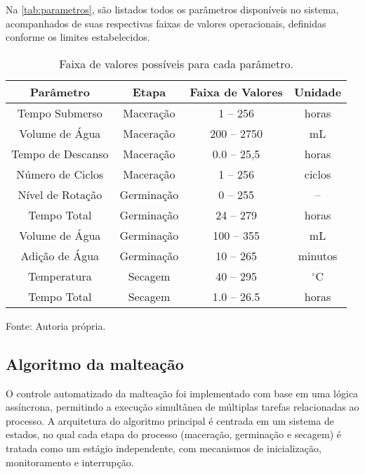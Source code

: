 Na \autoref{tab:parametros}, são listados todos os parâmetros disponíveis no sistema, acompanhados de suas respectivas faixas de valores operacionais, definidas conforme os limites estabelecidos.

\begin{table}[H]
    \caption{Faixa de valores possíveis para cada parâmetro.}
    \label{tab:parametros}
    \centering
    \begin{tabular}{cccc}
        \hline
        \bfseries Parâmetro & \bfseries Etapa & \bfseries Faixa de Valores & \bfseries Unidade \\
        \hline
        Tempo Submerso & Maceração & 1 -- 256  & horas \\
        Volume de Água & Maceração & 200 -- 2750 & mL \\
        Tempo de Descanso & Maceração & 0.0 -- 25,5 & horas \\
        Número de Ciclos & Maceração & 1 -- 256 & ciclos \\
        Nível de Rotação & Germinação & 0 -- 255 & -- \\
        Tempo Total & Germinação & 24 -- 279 & horas \\
        Volume de Água & Germinação & 100 -- 355 & mL \\
        Adição de Água & Germinação & 10 -- 265 & minutos \\
        Temperatura & Secagem & 40 -- 295 & $^{\circ}$C \\
        Tempo Total & Secagem & 1.0 -- 26.5 & horas \\
        \hline
    \end{tabular}

    {\centering\footnotesize Fonte: Autoria própria.\par}
\end{table}



\subsection{Algoritmo da malteação}

O controle automatizado da malteação foi implementado com base em uma lógica assíncrona, permitindo a execução simultânea de múltiplas tarefas relacionadas ao processo. A arquitetura do algoritmo principal é centrada em um sistema de estados, no qual cada etapa do processo (maceração, germinação e secagem) é tratada como um estágio independente, com mecanismos de inicialização, monitoramento e interrupção.

